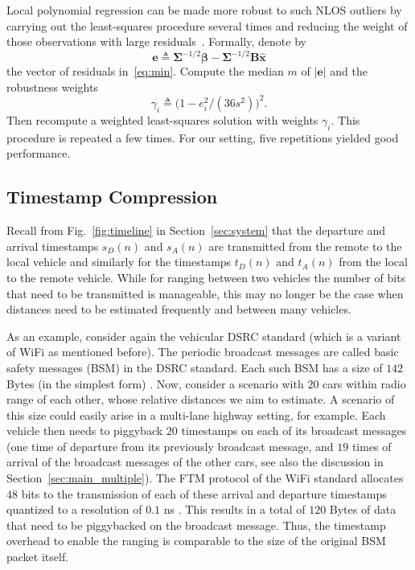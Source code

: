 \documentclass[12pt,journal,final,onecolumn]{IEEEtran}
\newcommand{\defeq}{\mathrel{\triangleq}}
\newcommand{\abs}[1]{\lvert{#1}\rvert}
\theoremstyle{definition}
\theoremstyle{myremark}
\begin{document}
Local polynomial regression can be made more robust to such NLOS outliers by
carrying out the least-squares procedure several times and reducing the weight
of those observations with large residuals~\cite{cleveland79}. Formally, denote
by 
\begin{equation*}
    \bm{e} \defeq \bm{\Sigma}^{-1/2}\bm{\beta}-\bm{\Sigma}^{-1/2}\bm{B}\hat{\bm{x}}
\end{equation*}
the vector of residuals in~\eqref{eq:min}. Compute the median $m$ of $\abs{\bm{e}}$
and the robustness weights
\begin{equation*}
    \gamma_i \defeq \bigl(1-e_i^2/(36s^2)\bigr)^2.
\end{equation*}
Then recompute a weighted least-squares solution with weights $\gamma_i$.
This procedure is repeated a few times. For our setting, five repetitions 
yielded good performance.


\subsection{Timestamp Compression}
\label{sec:main_compression}

Recall from Fig.~\ref{fig:timeline} in Section~\ref{sec:system} that the
departure and arrival timestamps $s_D(n)$ and $s_A(n)$ are transmitted from the
remote to the local vehicle and similarly for the timestamps $t_D(n)$ and
$t_A(n)$ from the local to the remote vehicle.  While for ranging between two
vehicles the number of bits that need to be transmitted is manageable, this may
no longer be the case when distances need to be estimated frequently and between
many vehicles. 

As an example, consider again the vehicular DSRC standard (which is a variant of
WiFi as mentioned before). The periodic broadcast messages are called basic
safety messages (BSM) in the DSRC standard. Each such BSM has a size of $142$
Bytes (in the simplest form) \cite{ansari2013}. Now, consider a scenario with
$20$ cars within radio range of each other, whose relative distances we aim to
estimate. A scenario of this size could easily arise in a multi-lane highway
setting, for example. Each vehicle then needs to piggyback $20$ timestamps on
each of its broadcast messages (one time of departure from its previously
broadcast message, and $19$ times of arrival of the broadcast messages of the
other cars, see also the discussion in Section~\ref{sec:main_multiple}). The FTM
protocol of the WiFi standard allocates $48$ bits to the transmission of each of
these arrival and departure timestamps quantized to a resolution of $0.1$ ns
\cite{11mc}. This results in a total of $120$ Bytes of data that need to be
piggybacked on the broadcast message.  Thus, the timestamp overhead to enable
the ranging is comparable to the size of the original BSM packet itself. 
\end{document}
